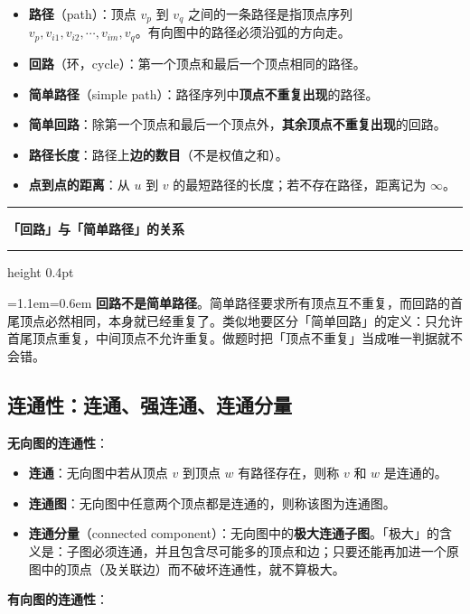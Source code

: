 \documentclass[11pt,openany,UTF8]{ctexbook}
\newcommand{\callouthead}[2]{%
  \par\addvspace{7pt}\noindent
  {\color{#1}\rule[-0.15em]{3pt}{1.05em}}\hspace{0.5em}%
  {\bfseries\color{#1}#2}\par\nobreak\vspace{-0.35em}%
  {\color{rulesep}\hrule height 0.4pt}\nobreak\vspace{0.45em}%
  \begingroup\small\setlength{\parindent}{0pt}%
  \leftskip=1.1em\rightskip=0.6em\noindent\ignorespaces}
\newcommand{\calloutend}{\par\endgroup\addvspace{7pt}}
\newenvironment{callwarn}[1]{\callouthead{warnbar}{#1}}{\calloutend}
\begin{document}
\begin{itemize}
\item \textbf{路径}（path）：顶点 $v_p$ 到 $v_q$ 之间的一条路径是指顶点序列 $v_p,v_{i1},v_{i2},\cdots,v_{im},v_q$。有向图中的路径必须沿弧的方向走。
\item \textbf{回路}（环，cycle）：第一个顶点和最后一个顶点相同的路径。
\item \textbf{简单路径}（simple path）：路径序列中\textbf{顶点不重复出现}的路径。
\item \textbf{简单回路}：除第一个顶点和最后一个顶点外，\textbf{其余顶点不重复出现}的回路。
\item \textbf{路径长度}：路径上\textbf{边的数目}（不是权值之和）。
\item \textbf{点到点的距离}：从 $u$ 到 $v$ 的最短路径的长度；若不存在路径，距离记为 $\infty$。
\end{itemize}
\begin{callwarn}{「回路」与「简单路径」的关系}
\textbf{回路不是简单路径}。简单路径要求所有顶点互不重复，而回路的首尾顶点必然相同，本身就已经重复了。类似地要区分「简单回路」的定义：只允许首尾顶点重复，中间顶点不允许重复。做题时把「顶点不重复」当成唯一判据就不会错。

\end{callwarn}

\subsection{连通性：连通、强连通、连通分量}

\textbf{无向图的连通性}：

\begin{itemize}
\item \textbf{连通}：无向图中若从顶点 $v$ 到顶点 $w$ 有路径存在，则称 $v$ 和 $w$ 是连通的。
\item \textbf{连通图}：无向图中任意两个顶点都是连通的，则称该图为连通图。
\item \textbf{连通分量}（connected component）：无向图中的\textbf{极大连通子图}。「极大」的含义是：子图必须连通，并且包含尽可能多的顶点和边；只要还能再加进一个原图中的顶点（及关联边）而不破坏连通性，就不算极大。
\end{itemize}
\textbf{有向图的连通性}：
\end{document}
